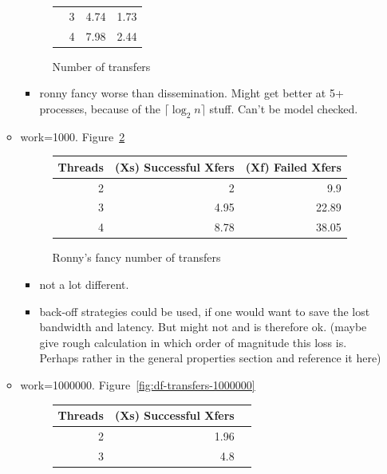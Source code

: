 \documentclass[a4paper, 10pt]{article}
\begin{document}
\begin{itemize}
\begin{itemize}
\begin{figure}[htbp]
\begin{tabular}{r | r | r r}
						              & 3       & 4.74                  & 1.73              \\
						              & 4       & 7.98                  & 2.44              \\
					\end{tabular}
					\caption{Number of transfers}
					\label{fig:df-transfers-100}
				\end{figure}
				\begin{itemize}
					\item ronny fancy worse than dissemination. Might get better at 5+ processes, because of the $\lceil \log_2 n \rceil$ stuff. Can't be model checked.
				\end{itemize}
			\item work=1000. Figure~\ref{fig:df-transfers-1000}
				\begin{figure}[htbp]
					\centering
					\begin{tabular}{r | r r}
						Threads & (Xs) Successful Xfers & (Xf) Failed Xfers \\
						\hline
						2       & 2                     & 9.9               \\
						3       & 4.95                  & 22.89             \\
						4       & 8.78                  & 38.05             \\
					\end{tabular}
					\caption{Ronny's fancy number of transfers}
					\label{fig:df-transfers-1000}
				\end{figure}
				\begin{itemize}
					\item not a lot different.
					\item back-off strategies could be used, if one would want to save the lost bandwidth and latency. But might not and is therefore ok. (maybe give rough calculation in which order of magnitude this loss is. Perhaps rather in the general properties section and reference it here)
				\end{itemize}
			\item work=1000000. Figure~\ref{fig:df-transfers-1000000}
				\begin{figure}[htbp]
					\centering
					\begin{tabular}{r | r r}
						Threads & (Xs) Successful Xfers \\
						\hline
						2       & 1.96                  \\
						3       & 4.8                   \\

\end{tabular}
\end{figure}
\end{itemize}
\end{itemize}
\end{document}
